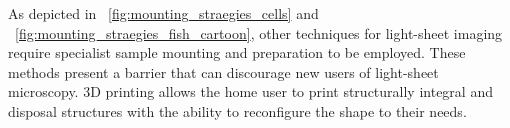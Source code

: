  As depicted in \figurename~\ref{fig:mounting_straegies_cells} and \figurename~\ref{fig:mounting_straegies_fish_cartoon}, other techniques for light-sheet imaging require specialist sample mounting and preparation to be employed.
 These methods present a barrier that can discourage new users of light-sheet microscopy.
 3D printing allows the home user to print structurally integral and disposal structures with the ability to reconfigure the shape to their needs.



